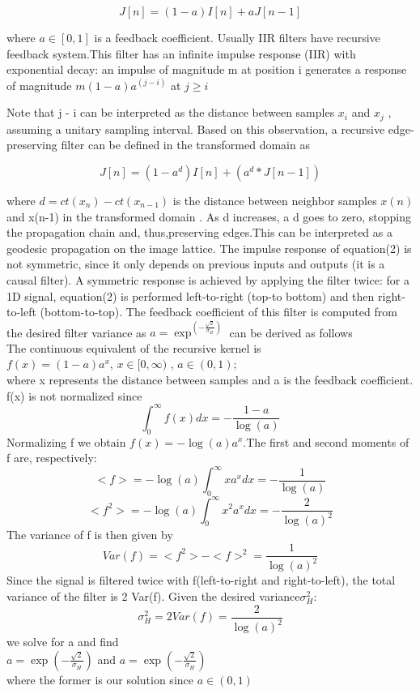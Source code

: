\documentclass[conference]{IEEEtran}
\begin{document}
$$J[n] = (1 - a)  I[n] + a J[n - 1] $$

where $a \in [0, 1]$ is a feedback coefficient. Usually IIR filters have recursive feedback system.This filter has an infinite impulse response (IIR) with exponential decay: an impulse of magnitude m at position i generates a response of magnitude $m (1 - a) a^(j - i)$ at $j \geq  i$

Note that j - i can be interpreted as the distance between samples $x_i$ and $x_j$ , 
assuming a unitary sampling interval. Based on this observation, a recursive edge-preserving filter can be defined in the transformed domain as 

$$J[n] = (1 - a^d ) I[n] + (a^d *J[n - 1]) $$

where $d = ct(x_n) - ct(x_{n-1})$ is the distance between neighbor samples $x(n)$ and x(n-1) in the transformed domain . As d increases, a d goes to zero, stopping the propagation chain and, thus,preserving edges.This can be interpreted as a geodesic propagation on the image lattice. The impulse response of equation(2) is not symmetric, since it only depends on previous inputs and outputs (it is a causal filter). A symmetric response is achieved by applying the filter twice: for a 1D signal, equation(2) is performed left-to-right (top-to bottom) and then right-to-left (bottom-to-top). The feedback coefficient of this filter is computed from the desired filter variance as $a = \exp^{(-\frac{ \sqrt{2}}{\sigma_H})}$ can be derived as follows
\\
The continuous equivalent of the recursive kernel is \\
$f(x) = (1-a)a^x$, $x \in [0,\infty)$ , $ a\in (0,1)$;\\
where x represents the distance between samples and a is the feedback coefficient. f(x) is not normalized since\\
$$\int_0^\infty f(x)dx = - \frac{1-a}{\log(a)}$$
Normalizing f we obtain $f(x) = -\log(a)a^x$.The first and second moments of f are, respectively:
$$<f> = -\log(a) \int_0^\infty xa^xdx = -\frac{1}{\log(a)}$$
$$<f^2> = -\log(a) \int_0^\infty x^2a^xdx = -\frac{2}{\log(a)^2}$$
The variance of f is then given by 
$$Var(f) = <f^2>-<f>^2 = \frac{1}{\log(a)^2}$$
Since the signal is filtered twice with f(left-to-right and right-to-left), the total variance of the filter is 2 Var(f). Given the desired variance$\sigma_H^2$:
$$\sigma_H^2 = 2Var(f) = \frac{2}{\log(a)^2}$$
we solve for a and find \\
$a = \exp(-\frac{\sqrt{2}}{\sigma_H})$ and $a = \exp(-\frac{\sqrt{2}}{\sigma_H})$\\
where the former is our solution since $a \in (0,1)$
\end{document}

